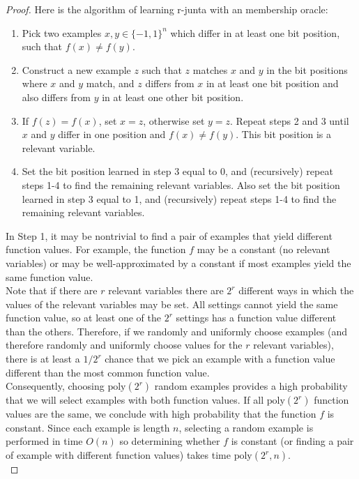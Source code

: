 \documentclass[12pt]{article}
\newcommand{\poly}{\mathrm{poly}}
\begin{document}
\begin{proof}
Here is the algorithm of learning r-junta with an membership oracle:

\begin{enumerate}
\item Pick two examples $x, y \in \{ -1, 1 \}^n$ which differ in at least one bit position, such that $f(x) \neq f(y)$.
\item Construct a new example $z$ such that $z$ matches $x$ and $y$ in the bit positions where $x$ and $y$ match, and $z$ differs from $x$ in at least one bit position and also differs from $y$ in at least one other bit position.
\item If $f(z) = f(x)$, set $x = z$, otherwise set $y = z$. Repeat steps 2 and 3 until $x$ and $y$ differ in one position and $f(x) \neq f(y)$. This bit position is a relevant variable.
\item Set the bit position learned in step 3 equal to 0, and (recursively) repeat steps 1-4 to find the remaining relevant variables. Also set the bit position learned in step 3 equal to 1, and (recursively) repeat steps 1-4 to find the remaining relevant variables.
\end{enumerate}

In Step 1, it may be nontrivial to find a pair of examples that yield different function values. For example, the function $f$ may be a constant (no relevant variables) or may be well-approximated by a constant if most examples yield the same function value. \\

Note that if there are $r$ relevant variables there are $2^r$ different ways in which the values of the relevant variables may be set. All settings cannot yield the same function value, so at least one of the $2^r$ settings has a function value different than the others. Therefore, if we randomly and uniformly choose examples (and therefore randomly and uniformly choose values for the $r$ relevant variables), there is at least a $1 / 2^r$ chance that we pick an example with a function value different than the most common function value. \\

Consequently, choosing $\poly (2^r)$ random examples provides a high probability that we will select examples with both function values. If all $\poly (2^r)$ function values are the same, we conclude with high probability  that the function $f$ is constant. Since each example is length $n$, selecting a random example is performed in time $O(n)$ so determining whether $f$ is constant (or finding a pair of example with different function values) takes time $\poly (2^r, n)$. \\


\end{proof}
\end{document}
